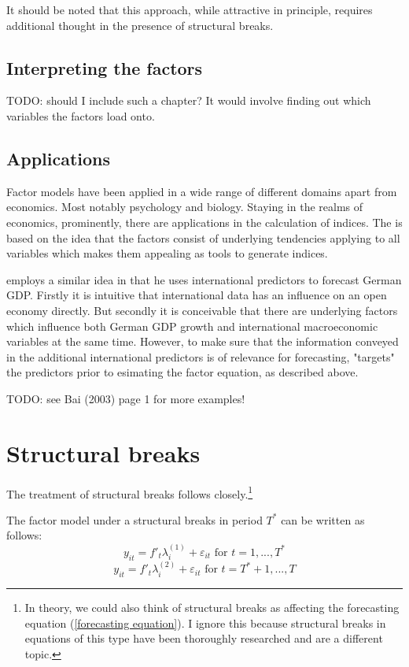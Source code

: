 \documentclass[11pt]{article}
\begin{document}
It should be noted that this approach, while attractive in principle, requires additional thought in the presence of structural breaks.


\subsection{Interpreting the factors}
TODO: should I include such a chapter? It would involve finding out which variables the factors load onto.

\subsection{Applications}
Factor models have been applied in a wide range of different domains apart from economics. Most notably psychology and biology. Staying in the realms of economics, prominently, there are applications in the calculation of indices. The is based on the idea that the factors consist of underlying tendencies applying to all variables which makes them appealing as tools to generate indices.

\citet{schumacher2010factor} employs a similar idea in that he uses international predictors to forecast German GDP. Firstly it is intuitive that international data has an influence on an open economy directly. But secondly it is conceivable that there are underlying factors which influence both German GDP growth and international macroeconomic variables at the same time. However, to make sure that the information conveyed in the additional international predictors is of relevance for forecasting, \citet{schumacher2010factor} "targets" the predictors prior to esimating the factor equation, as described above.


TODO: see Bai (2003) page 1 for more examples!

\section{Structural breaks}
The treatment of structural breaks follows \citet{breitung2011testing} closely.\footnote{In theory, we could also think of structural breaks as affecting the forecasting equation (\ref{forecasting equation}). I ignore this because structural breaks in equations of this type have been thoroughly researched and are a different topic.}

The factor model under a structural breaks in period $T^*$ can be written as follows:
\begin{equation}
	\label{}
	y_{it} = f'_t\lambda_i^{(1)} + \varepsilon_{it} \text{ for } t = 1, ..., T^*
\end{equation}
\begin{equation}
	\label{}
	y_{it} = f'_t\lambda_i^{(2)} + \varepsilon_{it} \text{ for } t = T^* + 1, ..., T
\end{equation}
\end{document}
